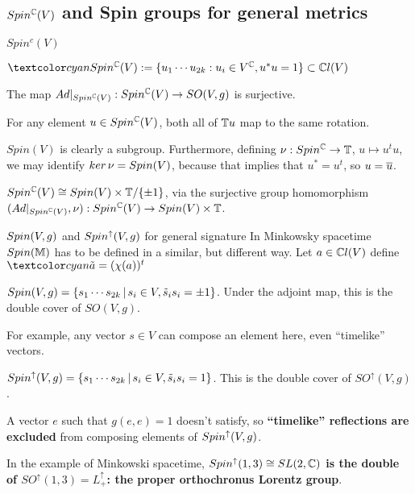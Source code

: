 \subsection{$Spin^\mathbb C(V)$ and Spin groups for general metrics}

\begin{frame}{$Spin^c(V)$} %

    \begin{Definition} $\defn{\spincv} := \set{u_1 \cdots u_{2k}: u_i \in V^\CC, u^*u = 1} \subset \cclv$
    \end{Definition}
    
    
    \begin{proposition}
    The map $Ad|_{Spin^\mathbb C(V)}: Spin^\mathbb C(V) \to SO(V, g)$ is surjective.
    
    For any element $u \in Spin^\mathbb C(V)$, both all of $\mathbb T u$ map to the same rotation.
    \end{proposition}
    
    $Spin(V)$ is clearly a subgroup. Furthermore,  defining $\nu: Spin^\mathbb C \to \mathbb T$, $u \mapsto u^t u$, we may identify $ker\,\nu = Spin(V)$, because that implies that $u^*= u^t$, so $u = \overline{u}$.
    
    $Spin^\mathbb C(V) \cong Spin(V) \times \mathbb T / \{\pm 1\}$, via the surjective group homomorphism $(Ad|_{Spin^\mathbb C(V)}, \nu): Spin^\mathbb C(V) \to Spin(V) \times \mathbb T$.
    
\end{frame}

\begin{frame}{$Spin(V, g)$ and $Spin^\uparrow(V, g)$ for general signature} %
    In Minkowsky spacetime $Spin(\mathbb M)$ has to be defined in a similar, but different way. Let $a \in \mathbb C l(V)$ define $\defn{\tilde a} = (\chi(a))^t$
    
    \begin{definition}
    $Spin(V, g) = \{s_1 \cdots s_{2k} \,|\, s_i \in V, \tilde s_i s_i = \pm 1\}$. Under the adjoint map, this is the double cover of $SO(V, g)$.
    \end{definition}
    
    For example, any vector $s \in V$ can compose an element here, even ``timelike'' vectors.
    
    \begin{definition}
    $Spin^\uparrow(V, g) = \{s_1 \cdots s_{2k} \,|\, s_i \in V, \tilde s_i s_i =  1\}$. This is the double cover of $SO^\uparrow(V, g)$.
    \end{definition}
    
    A vector $e$ such that $g(e, e)=1$ doesn't satisfy, so \textbf{``timelike'' reflections are excluded} from composing elements of  $Spin^\uparrow(V, g)$.
    
    In the example of Minkowski spacetime, \textbf{$Spin^\uparrow(1, 3) \cong SL(2, \mathbb C)$ is the double of $SO^\uparrow(1, 3) = L^\uparrow_+$: the proper orthochronus Lorentz group}.
    
\end{frame}

